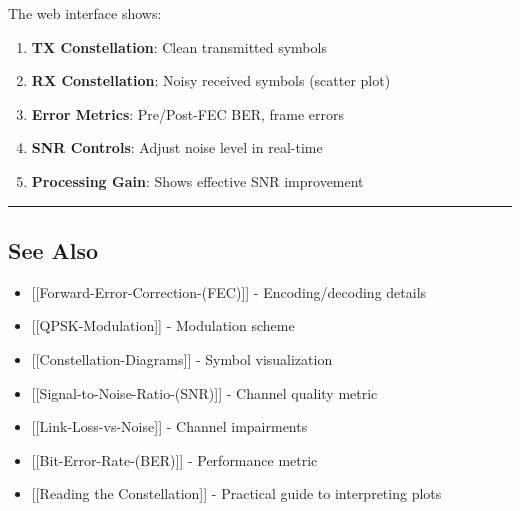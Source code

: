 The web interface shows:

\begin{enumerate}
\def\labelenumi{\arabic{enumi}.}
\tightlist
\item
  \textbf{TX Constellation}: Clean transmitted symbols
\item
  \textbf{RX Constellation}: Noisy received symbols (scatter plot)
\item
  \textbf{Error Metrics}: Pre/Post-FEC BER, frame errors
\item
  \textbf{SNR Controls}: Adjust noise level in real-time
\item
  \textbf{Processing Gain}: Shows effective SNR improvement
\end{enumerate}

\begin{center}\rule{0.5\linewidth}{0.5pt}\end{center}

\subsection{See Also}\label{see-also}

\begin{itemize}
\tightlist
\item
  {[}{[}Forward-Error-Correction-(FEC){]}{]} - Encoding/decoding details
\item
  {[}{[}QPSK-Modulation{]}{]} - Modulation scheme
\item
  {[}{[}Constellation-Diagrams{]}{]} - Symbol visualization
\item
  {[}{[}Signal-to-Noise-Ratio-(SNR){]}{]} - Channel quality metric
\item
  {[}{[}Link-Loss-vs-Noise{]}{]} - Channel impairments
\item
  {[}{[}Bit-Error-Rate-(BER){]}{]} - Performance metric
\item
  {[}{[}Reading the Constellation{]}{]} - Practical guide to
  interpreting plots
\end{itemize}
